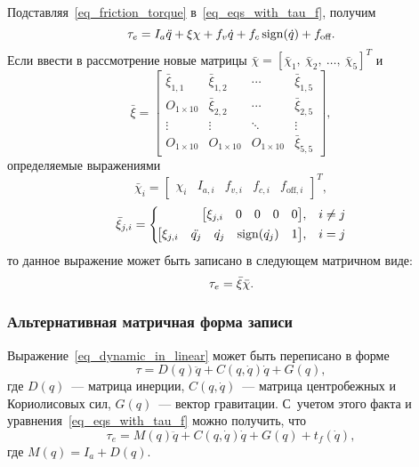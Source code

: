 Подставляя~\eqref{eq_friction_torque} в~\eqref{eq_eqs_with_tau_f}, получим
\begin{equation}
     \tau_e = I_a \ddot{q} + \xi \chi + f_v \dot{q} + f_c \operatorname{sign}(\dot{q}) + f_\text{off}\ldotp
\end{equation}
Если ввести в рассмотрение новые матрицы $\bar{\chi}=[\bar{\chi}_1, \: \bar\chi_2, \: \ldots, \: \bar\chi_5]^T$ и\linebreak
\begin{equation}
    \bar\xi =
    \begin{bmatrix}
        \bar\xi_{1,1} & \bar\xi_{1,2} & \cdots & \bar\xi_{1,5} \\
        O_{1 \times 10} & \bar\xi_{2,2} & \cdots & \bar\xi_{2,5} \\
        \vdots & \vdots & \ddots & \vdots \\
        O_{1 \times 10} & O_{1 \times 10} & O_{1 \times 10} & \bar\xi_{5,5}
    \end{bmatrix}\!\!,
\end{equation}
определяемые выражениями
\begin{equation}
    \bar{\chi}_i =
    \begin{bmatrix}
        \chi_i & I_{a,i} & f_{v,i} & f_{c,i} & f_{\text{off},i}
    \end{bmatrix}^T\!\!\!\!,
\end{equation}
\begin{equation}
    \bar{\xi}_{j,i} =
    \left\{
    \begin{aligned}
        \!\begin{bmatrix}\xi_{j,i} & 0 & 0 & 0 & 0\end{bmatrix}&, && i \ne j \\
        \!\begin{bmatrix}\xi_{j,i} & \ddot{q_j} & \dot{q_j} & \operatorname{sign}(\dot{q_j}) & 1\end{bmatrix}&, &&i = j
	\end{aligned}
	\right.
\end{equation}
то данное выражение может быть записано в следующем матричном виде:
\begin{equation}\label{eq_extended_dynamic_in_linear}
    \tau_e = \bar\xi \bar\chi \ldotp
\end{equation}

\subsubsection{Альтернативная матричная форма записи}\label{part_matrix_form_of_equation}
Выражение~\eqref{eq_dynamic_in_linear} может быть переписано в форме
\begin{equation}
    \tau = D(q) \ddot{q} + C(q,\dot{q}) \dot{q} + G(q),
\end{equation}
где $D(q)$~--- матрица инерции, $C(q,\dot{q})$~--- матрица центробежных и Кориолисовых сил, $G(q)$~--- вектор гравитации.
С~учетом этого факта и уравнения~\eqref{eq_eqs_with_tau_f} можно получить, что
\begin{equation}\label{eq_model_with_standard_matrix}
    \tau_e = M(q) \ddot{q} + C(q,\dot{q}) \dot{q} + G(q) + t_f(\dot{q}),
\end{equation}
где $M(q) = I_a + D(q)$.

